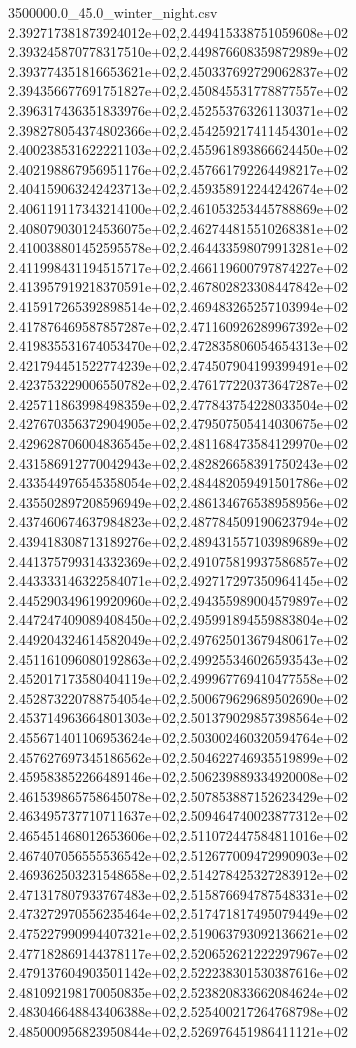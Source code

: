\begin{filecontents*}{3500000.0_45.0_winter_night.csv}
2.392717381873924012e+02,2.449415338751059608e+02
2.393245870778317510e+02,2.449876608359872989e+02
2.393774351816653621e+02,2.450337692729062837e+02
2.394356677691751827e+02,2.450845531778877557e+02
2.396317436351833976e+02,2.452553763261130371e+02
2.398278054374802366e+02,2.454259217411454301e+02
2.400238531622221103e+02,2.455961893866624450e+02
2.402198867956951176e+02,2.457661792264498217e+02
2.404159063242423713e+02,2.459358912244242674e+02
2.406119117343214100e+02,2.461053253445788869e+02
2.408079030124536075e+02,2.462744815510268381e+02
2.410038801452595578e+02,2.464433598079913281e+02
2.411998431194515717e+02,2.466119600797874227e+02
2.413957919218370591e+02,2.467802823308447842e+02
2.415917265392898514e+02,2.469483265257103994e+02
2.417876469587857287e+02,2.471160926289967392e+02
2.419835531674053470e+02,2.472835806054654313e+02
2.421794451522774239e+02,2.474507904199399491e+02
2.423753229006550782e+02,2.476177220373647287e+02
2.425711863998498359e+02,2.477843754228033504e+02
2.427670356372904905e+02,2.479507505414030675e+02
2.429628706004836545e+02,2.481168473584129970e+02
2.431586912770042943e+02,2.482826658391750243e+02
2.433544976545358054e+02,2.484482059491501786e+02
2.435502897208596949e+02,2.486134676538958956e+02
2.437460674637984823e+02,2.487784509190623794e+02
2.439418308713189276e+02,2.489431557103989689e+02
2.441375799314332369e+02,2.491075819937586857e+02
2.443333146322584071e+02,2.492717297350964145e+02
2.445290349619920960e+02,2.494355989004579897e+02
2.447247409089408450e+02,2.495991894559883804e+02
2.449204324614582049e+02,2.497625013679480617e+02
2.451161096080192863e+02,2.499255346026593543e+02
2.452017173580404119e+02,2.499967769410477558e+02
2.452873220788754054e+02,2.500679629689502690e+02
2.453714963664801303e+02,2.501379029857398564e+02
2.455671401106953624e+02,2.503002460320594764e+02
2.457627697345186562e+02,2.504622746935519899e+02
2.459583852266489146e+02,2.506239889334920008e+02
2.461539865758645078e+02,2.507853887152623429e+02
2.463495737710711637e+02,2.509464740023877312e+02
2.465451468012653606e+02,2.511072447584811016e+02
2.467407056555536542e+02,2.512677009472990903e+02
2.469362503231548658e+02,2.514278425327283912e+02
2.471317807933767483e+02,2.515876694787548331e+02
2.473272970556235464e+02,2.517471817495079449e+02
2.475227990994407321e+02,2.519063793092136621e+02
2.477182869144378117e+02,2.520652621222297967e+02
2.479137604903501142e+02,2.522238301530387616e+02
2.481092198170050835e+02,2.523820833662084624e+02
2.483046648843406388e+02,2.525400217264768798e+02
2.485000956823950844e+02,2.526976451986411121e+02

\end{filecontents*}
